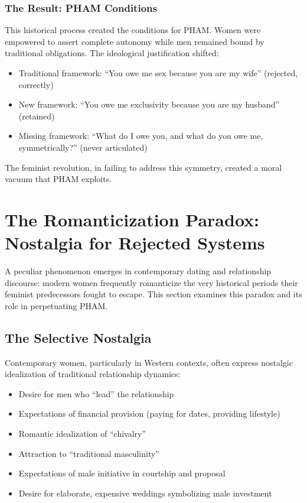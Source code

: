 \documentclass[12pt,openany]{book}
\numberwithin{equation}{chapter}
\begin{document}
\subsection{The Result: PHAM Conditions}

This historical process created the conditions for PHAM. Women were empowered to assert complete autonomy while men remained bound by traditional obligations. The ideological justification shifted:

\begin{itemize}
    \item Traditional framework: ``You owe me sex because you are my wife'' (rejected, correctly)
    \item New framework: ``You owe me exclusivity because you are my husband'' (retained)
    \item Missing framework: ``What do I owe you, and what do you owe me, symmetrically?'' (never articulated)
\end{itemize}

The feminist revolution, in failing to address this symmetry, created a moral vacuum that PHAM exploits.

\chapter{The Romanticization Paradox: Nostalgia for Rejected Systems}

A peculiar phenomenon emerges in contemporary dating and relationship discourse: modern women frequently romanticize the very historical periods their feminist predecessors fought to escape. This section examines this paradox and its role in perpetuating PHAM.

\section{The Selective Nostalgia}

Contemporary women, particularly in Western contexts, often express nostalgic idealization of traditional relationship dynamics:

\begin{itemize}
    \item Desire for men who ``lead'' the relationship
    \item Expectations of financial provision (paying for dates, providing lifestyle)
    \item Romantic idealization of ``chivalry''
    \item Attraction to ``traditional masculinity''
    \item Expectations of male initiative in courtship and proposal
    \item Desire for elaborate, expensive weddings symbolizing male investment
\end{itemize}
\end{document}
